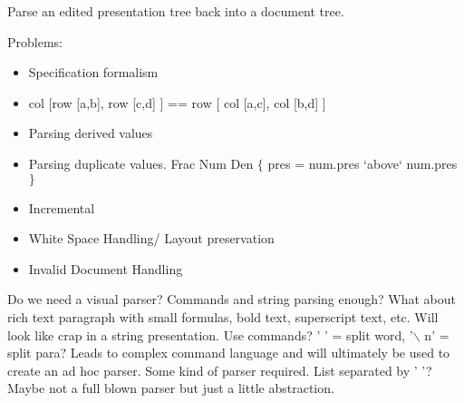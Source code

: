 \par Parse an edited presentation tree back into a document tree. 
\par Problems:
 \begin{itemize}
 
 \item Specification formalism
 \item col [row [a,b], row [c,d] ] == row [ col [a,c], col [b,d] ]
 \item Parsing derived values
 \item Parsing duplicate values. Frac Num Den $\{$ pres = num.pres
          `above` num.pres $\}$
 \item Incremental
 \item White Space Handling/ Layout preservation
 \item Invalid Document Handling
 \end{itemize}

 
Do we need a visual parser?
Commands and string parsing enough?
What about rich text paragraph with small formulas, bold text, superscript text, etc. Will look like crap in a string presentation. 
Use commands? ' ' = split word, '$\backslash$ n' = split para? Leads to complex command language and will ultimately be used to create an ad hoc parser.
Some kind of parser required. List separated by ' '?
Maybe not a full blown parser but just a little abstraction.
